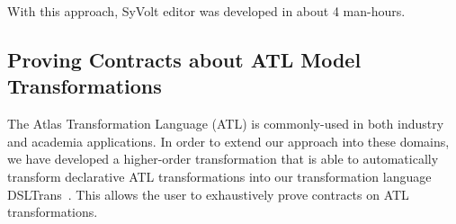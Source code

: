 With this approach, SyVolt editor was developed in about 4 man-hours.

\subsection{Proving Contracts about ATL Model Transformations}
The Atlas Transformation Language (ATL) is commonly-used in both industry and
academia applications. In order to extend our approach into these domains, we
have developed a higher-order transformation that is able to automatically
transform declarative ATL transformations into our transformation language
DSLTrans~\cite{Oakes}. This allows the user to exhaustively prove contracts on
ATL transformations.


 